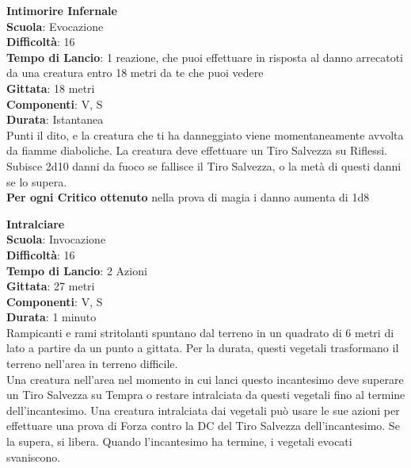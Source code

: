\begin{multicols}{2}
\medskip\textbf{Intimorire Infernale}\\
\textbf{Scuola}: Evocazione\\
\textbf{Difficoltà}: 16\\
\textbf{Tempo di Lancio}: 1 reazione, che puoi effettuare in risposta al danno arrecatoti da una creatura entro 18 metri da te che puoi vedere\\
\textbf{Gittata}: 18 metri\\
\textbf{Componenti}: V, S\\
\textbf{Durata}: Istantanea\\
Punti il dito, e la creatura che ti ha danneggiato viene momentaneamente avvolta da fiamme diaboliche. La creatura deve effettuare un Tiro Salvezza su Riflessi. Subisce 2d10 danni da fuoco se fallisce il Tiro Salvezza, o la metà di questi danni se lo supera.\\
\textbf{Per ogni Critico ottenuto} nella prova di magia i danno aumenta di 1d8

\medskip\textbf{Intralciare}\\
\textbf{Scuola}: Invocazione\\
\textbf{Difficoltà}: 16\\
\textbf{Tempo di Lancio}: 2 Azioni\\
\textbf{Gittata}: 27 metri\\
\textbf{Componenti}: V, S\\
\textbf{Durata}: 1 minuto\\
Rampicanti e rami stritolanti spuntano dal terreno in un quadrato di 6 metri di lato a partire da un punto a gittata. Per la durata, questi vegetali trasformano il terreno nell'area in terreno difficile.\\
Una creatura nell'area nel momento in cui lanci questo incantesimo deve superare un Tiro Salvezza su Tempra o restare intralciata da questi vegetali fino al termine dell'incantesimo. Una creatura intralciata dai vegetali può usare le sue azioni per effettuare una prova di Forza contro la DC del Tiro Salvezza dell'incantesimo. Se la supera, si libera. Quando l'incantesimo ha termine, i vegetali evocati svaniscono.


\end{multicols}

